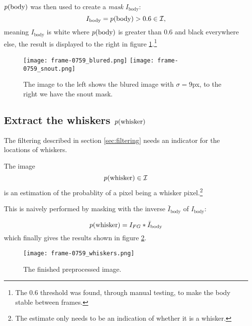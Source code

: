 $p{(\text{body})}$ was then used to create a \emph{mask} $I_{\text{body}}$:
\begin{equation}
  I_{\text{body}} = p{(\text{body})}>0.6 \in \mathcal{I},
\end{equation}
meaning $I_{\text{body}}$ is white where $p{(\text{body})}$ is greater than
0.6 and black everywhere else, the result is displayed to the right in figure \ref{fig:blured_snout}.\footnote{The 0.6 threshold was found,
through manual testing, to make the body stable between frames.}

\begin{figure}
\begin{center}
    \texttt{[image: frame-0759\_blured.png]}
    \texttt{[image: frame-0759\_snout.png]}
\end{center}
\caption{The image to the left shows the blured image with ${\sigma=9}$px, to the right we have the snout mask.}
\label{fig:blured_snout}
\end{figure}

\subsection{Extract the whiskers $p{(\text{whisker})}$}
\label{sec:findwhisker}
The filtering described in section \ref{sec:filtering} needs an
indicator for the locations of whiskers.

\begin{definition}
  The image
  \begin{equation}
    p{(\text{whisker})}\in \mathcal{I}
  \end{equation} is an estimation of the probablity of a pixel being
  a whisker pixel.\footnote{The estimate only needs to be an
    indication of whether it is a whisker.}
\end{definition}

This is naively performed by masking with the inverse
$\bar{I}_{\text{body}}$ of $I_{\text{body}}$:

\begin{equation}
  p{(\text{whisker})} = I_{FG} * \bar{I}_{\text{body}}
\end{equation}
which finally gives the results shown in figure \ref{fig:whiskers}.

\begin{figure}
\begin{center}
    \texttt{[image: frame-0759\_whiskers.png]}
\end{center}
\caption{The finished preprocessed image.}
\label{fig:whiskers}
\end{figure}

